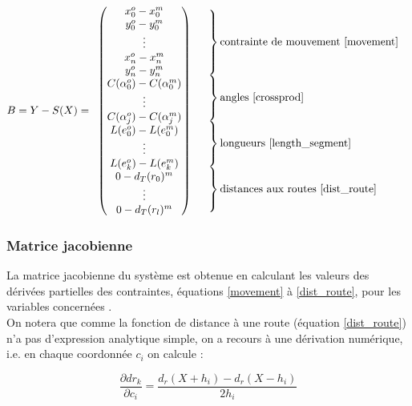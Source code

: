\documentclass[11pt]{article}
\begin{document}
$$ B = Y - S(X) =
\begin{array}{cc}
	\begin{pmatrix}
	x_0^{o} - x_0^{m}\\y_0^{o} - y_0^{m}\\ \vdots\\ x_n^{o} - x_n^{m}\\ y_n^{o} - y_n^{m}\\
	C(\alpha_0^{o}) - C(\alpha_0^{m})\\ \vdots \\ C(\alpha_j^{o}) - C(\alpha_j^{m})\\
	L(e_0^{o}) - L(e_0^{m})\\ \vdots \\ L(e_k^{o}) - L(e_k^{m})\\
	0 - d_T(r_0)^{m}\\ \vdots \\ 0-d_T(r_l)^{m}\\
	\end{pmatrix}
& 
	\begin{array}{l} 
		  \left. \rule{0pt}{7.5ex} \right\} \text{contrainte de mouvement \eqref{movement}} \\
		  \left. \rule{0pt}{5.5ex} \right\} \text{angles \eqref{crossprod}} \\
		  \left. \rule{0pt}{5.5ex} \right\} \text{longueurs \eqref{length_segment}} \\
		  \left. \rule{0pt}{5.5ex} \right\} \text{distances aux routes \eqref{dist_route}} \\
	\end{array} 
\end{array}
\\
$$

\subsubsection{Matrice jacobienne}
La matrice jacobienne du système est obtenue en calculant les valeurs des dérivées partielles des contraintes, équations \eqref{movement} à \eqref{dist_route}, pour les variables concernées .\\
On notera que comme la fonction de distance à une route (équation \eqref{dist_route}) n'a pas d'expression analytique simple, on a recours à une dérivation numérique, i.e. en chaque coordonnée $c_i$ on calcule :

\begin{equation*}
\frac{\partial dr_k}{\partial c_{i}} = \frac{d_r(X + h_i) - d_r(X - h_i)}{2h_i}
\end{equation*}
\\
\end{document}
